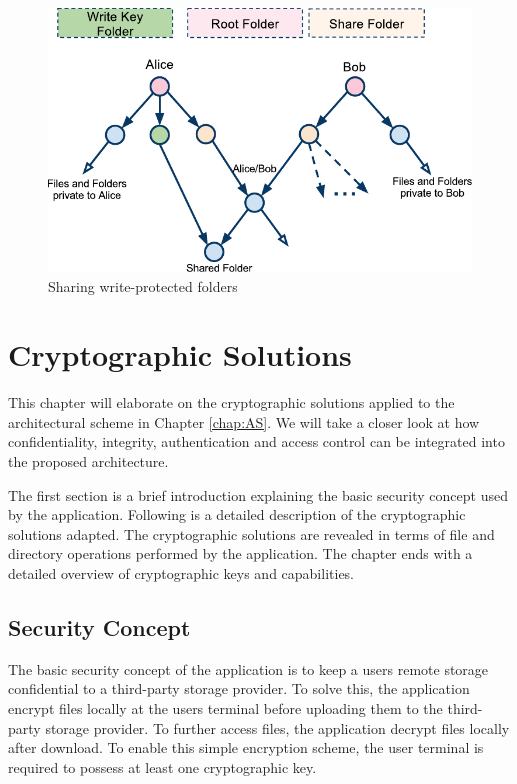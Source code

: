 \documentclass[pdftex,english,10pt,b5paper,twoside]{book}
\begin{document}
\begin{figure}[h!]
    \centering
    \includegraphics[width=\columnwidth]{ArchitectureShareReadOnlyFolder.pdf}
    \caption{Sharing write-protected folders}
    \label{fig:AS:readonly}
\end{figure}

\chapter{Cryptographic Solutions}
\label{chap:CS}
This chapter will elaborate on the cryptographic solutions applied to the
architectural scheme in Chapter \ref{chap:AS}. We will take a closer look at
how confidentiality, integrity, authentication and access control can be 
integrated into the proposed architecture.


The first section is a brief introduction explaining the basic
security concept used by the application. Following is a detailed description of
the cryptographic solutions adapted. The cryptographic solutions are revealed
in terms of file and directory operations performed by the application. The
chapter ends with a detailed overview of cryptographic keys and capabilities.

\section{Security Concept}
The basic security concept of the application is to keep a users remote storage
confidential to a third-party storage provider. To solve this, the application
encrypt files locally at the users terminal before uploading them to the
third-party storage provider. To further access files, the application
decrypt files locally after download. To enable this simple
encryption scheme, the user terminal is required to possess at least one cryptographic key.
\end{document}
